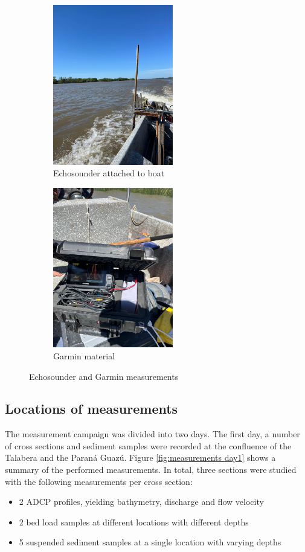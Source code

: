 \begin{figure}[H]
    \centering
    \begin{subfigure}[b]{0.48\textwidth}
        \includegraphics[width=\linewidth, height=7cm]{figures/ch4/Echosounder.jpg}
        \caption{Echosounder attached to boat}
        
    \end{subfigure}
    \hfill
    \begin{subfigure}[b]{0.48\textwidth}
        \includegraphics[width=\linewidth, height=7cm]{figures/ch4/garmin.jpg}
        \caption{Garmin material}
        
    \end{subfigure}
    \caption{Echosounder and Garmin measurements}
    \label{fig:Garmin}
\end{figure}




\subsection{Locations of measurements}
The measurement campaign was divided into two days. The first day, a number of cross sections and sediment samples were recorded at the confluence of the Talabera and the Paraná Guazú. Figure \ref{fig:measurements day1} shows a summary of the performed measurements. In total, three sections were studied with the following measurements per cross section:
\begin{itemize}
    \item 2 ADCP profiles, yielding bathymetry, discharge and flow velocity
    \item 2 bed load samples at different locations with different depths
    \item 5 suspended sediment samples at a single location with varying depths
\end{itemize}

